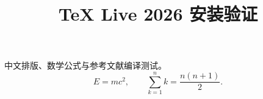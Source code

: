 \documentclass[UTF8]{ctexart}
\title{TeX Live 2026 安装验证}
\author{}
\date{}
\begin{document}
\maketitle
中文排版、数学公式与参考文献编译测试。\cite{test}
\[
  E = mc^2, \qquad \sum_{k=1}^{n} k = \frac{n(n+1)}{2}.
\]
\printbibliography
\end{document}
